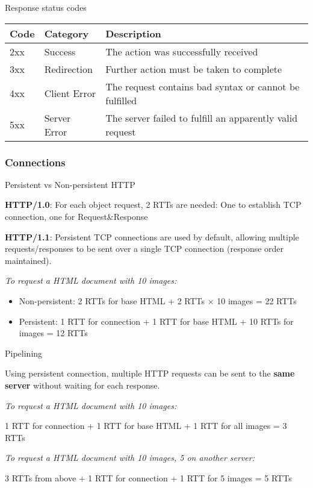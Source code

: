 \begin{definition}
    {Response status codes}
    \begin{tabular}{|l|l|l|}
        \hline
        \textbf{Code} & \textbf{Category} & \textbf{Description}                                     \\
        \hline
        2xx           & Success           & The action was successfully received                     \\
        \hline
        3xx           & Redirection       & Further action must be taken to complete                 \\
        \hline
        4xx           & Client Error      & The request contains bad syntax or cannot be fulfilled   \\
        \hline
        5xx           & Server Error      & The server failed to fulfill an apparently valid request \\
        \hline
    \end{tabular}
\end{definition}

\subsubsection{Connections}

\begin{theorem}
    {Persistent vs Non-persistent HTTP}

    \textbf{HTTP/1.0}: For each object request, 2 RTTs are needed: One to establish TCP connection, one for Request\&Response

    \textbf{HTTP/1.1}: Persistent TCP connections are used by default, allowing multiple requests/responses to be sent over a single TCP connection (response order maintained).

    \tcblower

    \textit{To request a HTML document with 10 images:}

    \begin{itemize}
        \item Non-persistent: 2 RTTs for base HTML + 2 RTTs $\times$ 10 images = 22 RTTs
        \item Persistent: 1 RTT for connection + 1 RTT for base HTML + 10 RTTs for images = 12 RTTs
    \end{itemize}
\end{theorem}

\begin{theorem}
    {Pipelining}

    Using persistent connection, multiple HTTP requests can be sent to the \textbf{same server} without waiting for each response.

    \tcblower

    \textit{To request a HTML document with 10 images:}

    1 RTT for connection + 1 RTT for base HTML + 1 RTT for all images = 3 RTTs

    \textit{To request a HTML document with 10 images, 5 on another server:}

    3 RTTs from above + 1 RTT for connection + 1 RTT for 5 images = 5 RTTs
\end{theorem}

